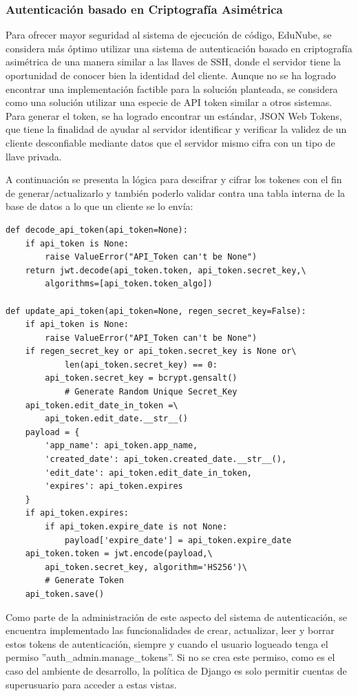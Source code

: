 \subsubsection{Autenticación basado en Criptografía Asimétrica}
Para ofrecer mayor seguridad al sistema de ejecución de código, EduNube, se considera más óptimo utilizar una sistema de autenticación basado en criptografía asimétrica de una manera similar a las llaves de SSH, donde el servidor tiene la oportunidad de conocer bien la identidad del cliente. Aunque no se ha logrado encontrar una implementación factible para la solución planteada, se considera como una solución utilizar una especie de API token similar a otros sistemas. Para generar el token, se ha logrado encontrar un estándar, JSON Web Tokens, que tiene la finalidad de ayudar al servidor identificar y verificar la validez de un cliente desconfiable mediante datos que el servidor mismo cifra con un tipo de llave privada.

A continuación se presenta la lógica para descifrar y cifrar los tokenes con el fin de generar/actualizarlo y también poderlo validar contra una tabla interna de la base de datos a lo que un cliente se lo envía:
\begin{lstlisting}
def decode_api_token(api_token=None):
    if api_token is None:
        raise ValueError("API_Token can't be None")
    return jwt.decode(api_token.token, api_token.secret_key,\
        algorithms=[api_token.token_algo])

def update_api_token(api_token=None, regen_secret_key=False):
    if api_token is None:
        raise ValueError("API_Token can't be None")
    if regen_secret_key or api_token.secret_key is None or\
            len(api_token.secret_key) == 0:
        api_token.secret_key = bcrypt.gensalt()
            # Generate Random Unique Secret_Key
    api_token.edit_date_in_token =\
        api_token.edit_date.__str__()
    payload = {
        'app_name': api_token.app_name,
        'created_date': api_token.created_date.__str__(),
        'edit_date': api_token.edit_date_in_token,
        'expires': api_token.expires
    }
    if api_token.expires:
        if api_token.expire_date is not None:
            payload['expire_date'] = api_token.expire_date
    api_token.token = jwt.encode(payload,\
        api_token.secret_key, algorithm='HS256')\
        # Generate Token
    api_token.save()
\end{lstlisting}

Como parte de la administración de este aspecto del sistema de autenticación, se encuentra implementado las funcionalidades de crear, actualizar, leer y borrar estos tokens de autenticación, siempre y cuando el usuario logueado tenga el permiso ''auth\_admin.manage\_tokens''. Si no se crea este permiso, como es el caso del ambiente de desarrollo, la política de Django es solo permitir cuentas de superusuario para acceder a estas vistas.


